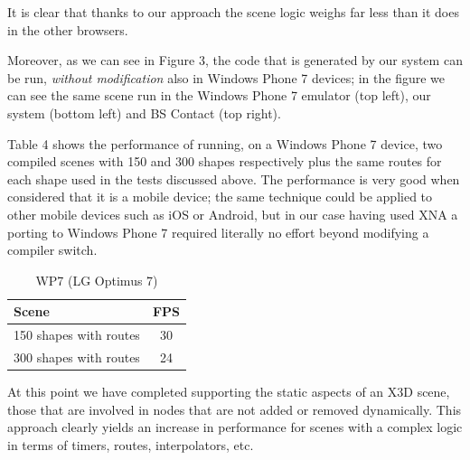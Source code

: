 It is clear that thanks to our approach the scene logic weighs far less than it does in the other browsers.

Moreover, as we can see in Figure 3, the code that is generated by our system can be run, \textit{without modification} also in Windows Phone 7 devices; in the figure we can see the same scene run in the Windows Phone 7 emulator (top left), our system (bottom left) and BS Contact (top right). 

Table 4 shows the performance of running, on a Windows Phone 7 device, two compiled scenes with 150 and 300 shapes respectively plus the same routes for each shape used in the tests discussed above. The performance is very good when considered that it is a mobile device; the same technique could be applied to other mobile devices such as iOS or Android, but in our case having used XNA a porting to Windows Phone 7 required literally no effort beyond modifying a compiler switch.

\begin{table}[htb]\small
\centering
\begin{tabular}{|l|c|}
\hline
Scene & FPS 	 \\
\hline
150 shapes with routes & 30 \\
300 shapes with routes & 24 \\
\hline
\end{tabular}
\caption{WP7 (LG Optimus 7)}
\end{table}

At this point we have completed supporting the static aspects of an X3D scene, those that are involved in nodes that are not added or removed dynamically. This approach clearly yields an increase in performance for scenes with a complex logic in terms of timers, routes, interpolators, etc.
